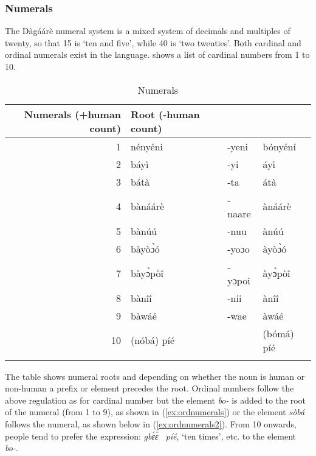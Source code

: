 \subsubsection{Numerals}
The Dàgáárè numeral system is a mixed system of decimals and multiples of twenty,
so that 15 is ‘ten and five’, while 40 is ‘two twenties’. Both cardinal and ordinal numerals exist
in the language.  shows a list of cardinal numbers from 1 to 10.
\begin{table}
    \begin{tabular}{rlll}\lsptoprule
Numerals (+human count) & Root (-human count) \\\midrule
1 &nényéni &-yeni& bónyéní \\
2 &báyì &-yi&  áyì\\
3 &bátà &-ta& átà \\
4 &bànáárè& -naare& ànáárè\\
5 &bànúú &-nuu& ànúú\\
6 &bàyòɔ̀ó& -yoɔo& àyòɔ̀ó \\
7 &bàyɔ̀pòî& -yɔpoi& àyɔ̀pòî \\
8 &bànîî &-nii & ànîî \\
9 &bàwáé &-wae& àwáé \\
10 &(nóbá) píé&& (bómá) píé\\\lspbottomrule
\end{tabular}
    \caption{Numerals}
    \label{tab:numerals}
\end{table}  



The table shows numeral roots and depending on whether the noun is human or non-human a
prefix or element precedes the root. Ordinal numbers follow the above regulation as for
cardinal number but the element \textit{bo-} is added to the root of the numeral (from 1 to 9), as
shown in (\ref{ex:ordnumerals}) or the element \textit{sòbá}  follows the numeral, as shown below in (\ref{ex:ordnumerals2}). From 10
onwards, people tend to prefer the expression: \textit{gbɛ́ɛ́~ píé}, ‘ten times’, etc. to the element \textit{bo-}.


